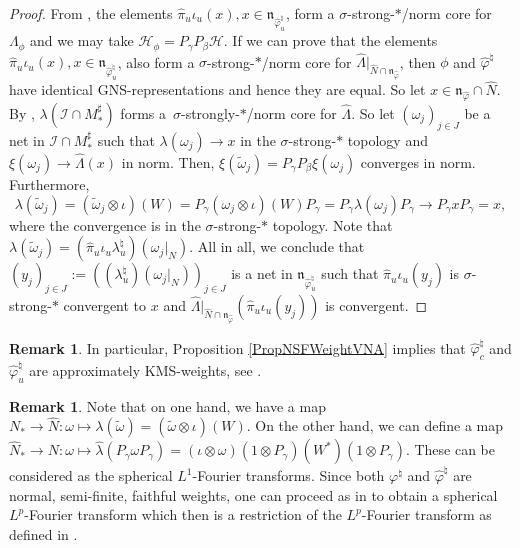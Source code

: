 \documentclass[pdftex]{sigma}
\numberwithin{equation}{section}
\theoremstyle{definition}
\newtheorem{rmk}[thm]{Remark}
\newcommand{\cHil}{\mathcal{H}}
\begin{document}
\begin{proof}
 From \cite[Proposition 1.32]{KusVae}, the elements $\hat{\pi}_{u}  \iota_u(x), x \in \mathfrak{n}_{\hat{\varphi}_{u}^\natural}$, form a $\sigma$-strong-$\ast$/norm core for~$\Lambda_\phi$ and we may take $\cHil_\phi = P_\gamma P_\beta  \cHil$. If we can prove that    the elements $\hat{\pi}_{u}  \iota_u(x), x \in \mathfrak{n}_{\hat{\varphi}_{u}^\natural}$, also form a $\sigma$-strong-$\ast$/norm core for $\hat{\Lambda}\vert_{\hat{N} \cap \mathfrak{n}_{\hat{\varphi}}}$, then $\phi$ and $\hat{\varphi}^\natural$ have identical GNS-representations and hence they are equal. So let $x \in \mathfrak{n}_{\hat{\varphi}} \cap \hat{N}$. By \cite[Proposition~2.6]{KusVaeII}, $\lambda(\mathcal{I} \cap M_\ast^\sharp)$  forms a~$\sigma$-strongly-$\ast$/norm core for $\hat{\Lambda}$. So let $(\omega_j)_{j \in J}$ be a net in $\mathcal{I} \cap M_\ast^\sharp$  such that $\lambda(\omega_j) \rightarrow x$ in the $\sigma$-strong-$\ast$ topology and $\xi(\omega_j) \rightarrow \hat{\Lambda}(x)$ in norm. Then, $\xi(\tilde{\omega}_j) = P_\gamma P_\beta \xi(\omega_j)$ converges in norm. Furthermore,
\[
\lambda(\tilde{\omega}_j) = (\tilde{\omega}_j \otimes \iota)(W) = P_\gamma (\omega_j \otimes \iota)(W) P_\gamma = P_\gamma \lambda(\omega_j) P_\gamma \rightarrow P_\gamma x P_\gamma = x,
\]
where the convergence is in the $\sigma$-strong-$\ast$ topology. Note that $\lambda(\tilde{\omega}_j) = (\hat{\pi}_u \iota_u \lambda_u^\natural)(\omega_j\vert_N)$. All in all, we conclude that $(y_j)_{j \in J} := ((\lambda_u^\natural)(\omega_j\vert_N))_{j \in J}$ is a net in $ \mathfrak{n}_{\hat{\varphi}_{u}^\natural}$ such that $\hat{\pi}_{u}  \iota_u(y_j)$ is $\sigma$-strong-$\ast$ convergent to $x$ and $\hat{\Lambda}\vert_{\hat{N} \cap \mathfrak{n}_{\hat{\varphi}}}(\hat{\pi}_{u}  \iota_u(y_j))$ is convergent.
\end{proof}

\begin{rmk}
In particular, Proposition \ref{PropNSFWeightVNA} implies that $\hat{\varphi}_{c}^\natural$ and $\hat{\varphi}_{u}^\natural$ are approximately KMS-weights, see \cite[Proposition 1.35]{KusVae}.
\end{rmk}

\begin{rmk}
Note that on one hand, we have a map $N_\ast \rightarrow \hat{N}: \omega \mapsto \lambda(\tilde{\omega}) = (\tilde{\omega} \otimes \iota)(W)$. On the other hand, we can def\/ine a map $\hat{N}_\ast \rightarrow N: \omega \mapsto \hat{\lambda}(P_\gamma \omega P_\gamma) = (\iota \otimes \omega)(1\otimes P_\gamma)(W^\ast)(1\otimes P_\gamma)$. These can be considered as the spherical $L^1$-Fourier transforms. Since both $\varphi^\natural$ and $\hat{\varphi}^\natural$ are normal, semi-f\/inite, faithful weights, one can proceed as in \cite{Cas} to obtain a spherical $L^p$-Fourier transform which then is a restriction of the $L^p$-Fourier transform as def\/ined in \cite[Theorem 5.6]{Cas}.
\end{rmk}
\end{document}
